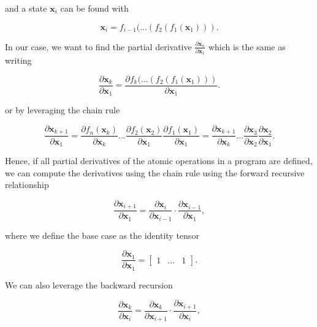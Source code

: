 \documentclass{article}
\begin{document}
and a state $\mathbf{x}_{i}$ can be found with

\begin{equation}
    \mathbf{x}_{i} = f_{i-1}( \dots (f_2(f_1(\mathbf{x}_1))).
\end{equation}

In our case, we want to find the partial derivative $\frac{\partial \mathbf{x}_n}{\partial \mathbf{x}_1}$ which is the same as writing

\begin{equation}
    \frac{\partial \mathbf{x}_k}{\partial \mathbf{x}_1} = \frac{\partial f_k( \dots (f_2(f_1(\mathbf{x}_1)))}{\partial \mathbf{x}_1}.
\end{equation}

or by leveraging the chain rule

\begin{equation}
    \frac{\partial \mathbf{x}_{k+1}}{\partial \mathbf{x}_1} = \frac{\partial f_n(\mathbf{x}_{k})}{\partial \mathbf{x}_{k}} \dots \frac{\partial f_{2}(\mathbf{x}_2)}{\partial \mathbf{x}_{1}} \frac{\partial f_{1}(\mathbf{x}_1)}{\partial \mathbf{x}_1} = \frac{\partial \mathbf{x}_{k+1}}{\partial \mathbf{x}_{k}} \dots \frac{\partial \mathbf{x}_{3}}{\partial \mathbf{x}_{2}} \frac{\partial \mathbf{x}_{2}}{\partial \mathbf{x}_{1}}.
\end{equation}

Hence, if all partial derivatives of the atomic operations in a program are defined,  we can compute the derivatives using the chain rule using the forward recursive relationship

\begin{equation}
    \frac{\partial \mathbf{x}_{i+1}}{\partial \mathbf{x}_1} = \frac{\partial \mathbf{x}_{i}}{\partial \mathbf{x}_{i-1}} \cdot  \frac{\partial \mathbf{x}_{i-1}}{\partial \mathbf{x}_{1}},
\end{equation}

where we define the base case as the identity tensor

\begin{equation}
    \frac{\partial \mathbf{x}_{1}}{\partial \mathbf{x}_{1}} = \begin{bmatrix}
        1 & \dots & 1
    \end{bmatrix}.
\end{equation}

We can also leverage the backward recursion

\begin{equation}
    \frac{\partial \mathbf{x}_{k}}{\partial \mathbf{x}_i} = \frac{\partial \mathbf{x}_{k}}{\partial \mathbf{x}_{i+1}} \cdot  \frac{\partial \mathbf{x}_{i+1}}{\partial \mathbf{x}_{i}},
\end{equation}
\end{document}
